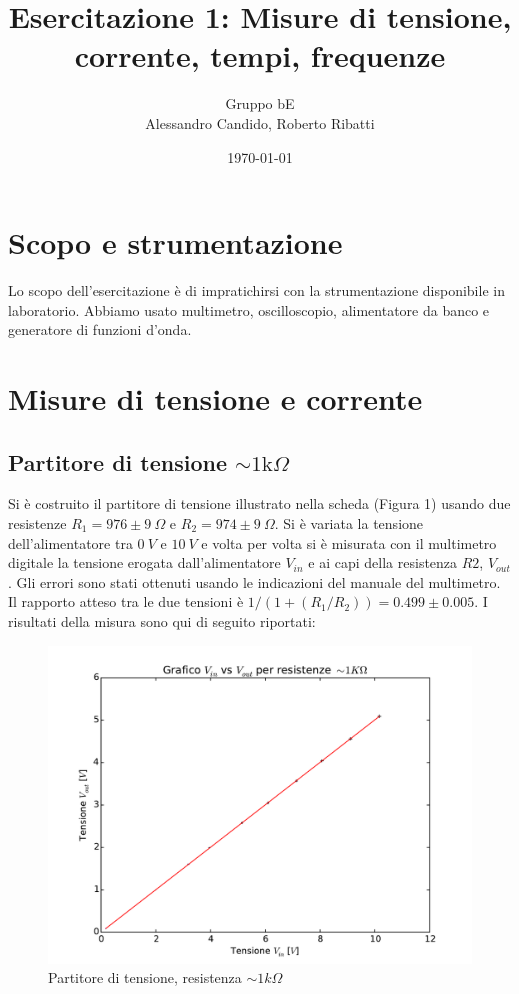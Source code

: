 \documentclass[10pt,a4paper]{article}
\title{Esercitazione 1: Misure di tensione, corrente, tempi, frequenze}
\author{Gruppo bE \\ Alessandro Candido, Roberto Ribatti}
\date{\today}
\begin{document}
\maketitle

\section{Scopo e strumentazione}
Lo scopo dell'esercitazione è di impratichirsi con la strumentazione disponibile in laboratorio. Abbiamo usato multimetro, oscilloscopio, alimentatore da banco e generatore di funzioni d'onda.

\section{Misure di tensione e corrente}

\subsection{Partitore di tensione $\sim1\text{k}\Omega$}
Si è costruito il partitore di tensione illustrato nella scheda (Figura 1) usando due resistenze $R_1 = 976 \pm 9~\Omega$ e $R_2 = 974 \pm 9 ~\Omega$.
Si è variata la tensione dell'alimentatore tra $0~V$ e $10~V$ e volta per volta si è misurata con il multimetro digitale la tensione erogata dall'alimentatore $V_{in}$ e ai capi della resistenza $R2$, $V_{out}$. Gli errori sono stati ottenuti usando le indicazioni del manuale del multimetro.
Il rapporto atteso tra le due tensioni è $1/(1+(R_1/R_2))=0.499 \pm 0.005$. 
I risultati della misura sono qui di seguito riportati:

\begin{figure}[h]
\centering
	\begin{minipage}[h]{0.35\textwidth}
	\centering
	
	\end{minipage}%
	\begin{minipage}[h]{0.65\textwidth}
	\centering
	\includegraphics[width=1\textwidth]{../grafici/fit_1KOhm.pdf}
	\caption{Partitore di tensione, resistenza $\sim 1k\Omega$}
	\end{minipage}
\end{figure}
\end{document}
